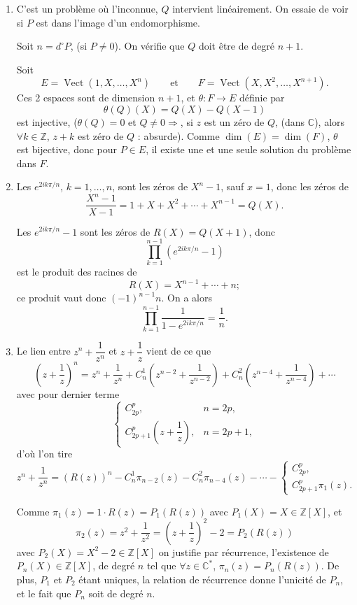 \begin{enumerate}[label=\arabic*.,leftmargin=2.2em,itemsep=1.1em]

\item C'est un problème où l'inconnue, $Q$ intervient linéairement. On essaie de voir si $P$ est dans l'image d'un endomorphisme.

Soit $n=d^\circ P$, (si $P\ne0$). On vérifie que $Q$ doit être de degré $n+1$.

Soit
\[
E=\operatorname{Vect}(1,X,\ldots,X^n)\qquad\text{et}\qquad
F=\operatorname{Vect}(X,X^2,\ldots,X^{n+1}).
\]
Ces 2 espaces sont de dimension $n+1$, et $\theta:F\longrightarrow E$ définie par
\[
\theta(Q)(X)=Q(X)-Q(X-1)
\]
est injective, ($\theta(Q)=0$ et $Q\ne0\Rightarrow$, si $z$ est un zéro de $Q$, (dans $\mathbb C$), alors $\forall k\in\mathbb Z$, $z+k$ est zéro de $Q$ : absurde). Comme $\dim(E)=\dim(F)$, $\theta$ est bijective, donc pour $P\in E$, il existe une et une seule solution du problème dans $F$.

\item Les $e^{2ik\pi/n}$, $k=1,\ldots,n$, sont les zéros de $X^n-1$, sauf $x=1$, donc les zéros de
\[
\frac{X^n-1}{X-1}=1+X+X^2+\cdots+X^{n-1}=Q(X).
\]

Les $e^{2ik\pi/n}-1$ sont les zéros de $R(X)=Q(X+1)$, donc
\[
\prod_{k=1}^{n-1}(e^{2ik\pi/n}-1)
\]
est le produit des racines de
\[
R(X)=X^{n-1}+\cdots+n;
\]
ce produit vaut donc $(-1)^{n-1}n$. On a alors
\[
\prod_{k=1}^{n-1}\frac1{1-e^{2ik\pi/n}}=\frac1n.
\]

\item Le lien entre $z^n+\dfrac1{z^n}$ et $z+\dfrac1z$ vient de ce que
\[
\left(z+\frac1z\right)^n
=z^n+\frac1{z^n}+C_n^1\left(z^{n-2}+\frac1{z^{n-2}}\right)+C_n^2\left(z^{n-4}+\frac1{z^{n-4}}\right)+\cdots
\]
avec pour dernier terme
\[
\begin{cases}
C_{2p}^p,& n=2p,\\[2mm]
C_{2p+1}^p\left(z+\dfrac1z\right),& n=2p+1,
\end{cases}
\]
d'où l'on tire
\[
z^n+\frac1{z^n}
=(R(z))^n-C_n^1\pi_{n-2}(z)-C_n^2\pi_{n-4}(z)-\cdots-
\begin{cases}
C_{2p}^p,\\[1mm]
C_{2p+1}^p\pi_1(z).
\end{cases}
\]

Comme $\pi_1(z)=1\cdot R(z)=P_1(R(z))$ avec $P_1(X)=X\in\mathbb Z[X]$, et
\[
\pi_2(z)=z^2+\frac1{z^2}=\left(z+\frac1z\right)^2-2=P_2(R(z))
\]
avec $P_2(X)=X^2-2\in\mathbb Z[X]$ on justifie par récurrence, l'existence de $P_n(X)\in\mathbb Z[X]$, de degré $n$ tel que $\forall z\in\mathbb C^*$, $\pi_n(z)=P_n(R(z))$. De plus, $P_1$ et $P_2$ étant uniques, la relation de récurrence donne l'unicité de $P_n$, et le fait que $P_n$ soit de degré $n$.


\end{enumerate}
